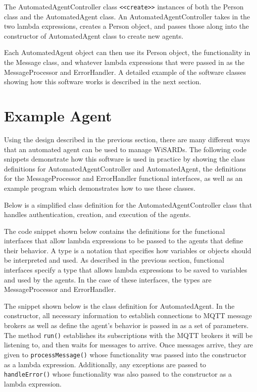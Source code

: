 The AutomatedAgentController class \verb|<<create>>| instances of both the Person class and the AutomatedAgent class. An AutomatedAgentController takes in the two lambda expressions, creates a Person object, and passes those along into the constructor of AutomatedAgent class to create new agents. 

Each AutomatedAgent object can then use its Person object, the functionality in the Message class, and whatever lambda expressions that were passed in as the MessageProcessor and ErrorHandler. A detailed example of the software classes showing how this software works is described in the next section.

\section{Example Agent}
Using the design described in the previous section, there are many different ways that an automated agent can be used to manage WiSARDs. The following code snippets demonstrate how this software is used in practice by showing the class definitions for AutomatedAgentController and AutomatedAgent, the definitions for the MessageProcessor and ErrorHandler functional interfaces, as well as an example program which demonstrates how to use these classes.

Below is a simplified class definition for the AutomatedAgentController class that handles authentication, creation, and execution of the agents.

 
The code snippet shown below contains the definitions for the functional interfaces that allow lambda expressions to be passed to the agents that define their behavior. A type is a notation that specifies how variables or objects should be interpreted and used. As described in the previous section, functional interfaces specify a type that allows lambda expressions to be saved to variables and used by the agents. In the case of these interfaces, the types are MessageProcessor and ErrorHandler. 

 
 
The snippet shown below is the class definition for AutomatedAgent. In the constructor, all necessary information to establish connections to MQTT message brokers as well as define the agent's behavior is passed in as a set of parameters. The method \verb|run()| establishes its subscriptions with the MQTT brokers it will be listening to, and then waits for messages to arrive. Once messages arrive, they are given to \verb|processMessage()| whose functionality was passed into the constructor as a lambda expression. Additionally, any exceptions are passed to \verb|handleError()| whose functionality was also passed to the constructor as a lambda expression.


